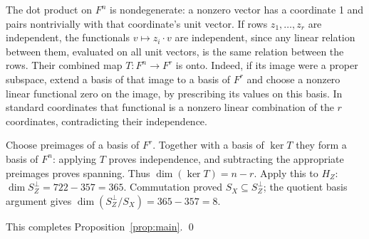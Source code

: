 \documentclass{article}
\begin{document}
The dot product on \(F^n\) is nondegenerate: a nonzero vector has a coordinate
1 and pairs nontrivially with that coordinate's unit vector. If rows
\(z_1, \dots, z_r\) are independent, the functionals \(v \mapsto z_i \cdot v\)
are independent, since any linear relation between them, evaluated on all unit
vectors, is the same relation between the rows. Their combined map
\(T \colon F^n \to F^r\) is onto. Indeed, if its image were a proper subspace,
extend a basis of that image to a basis of \(F^r\) and choose a nonzero linear
functional zero on the image, by prescribing its values on this basis. In
standard coordinates that functional is a nonzero linear combination of the
\(r\) coordinates, contradicting their independence.

Choose preimages of a basis of \(F^r\). Together with a basis of \(\ker T\)
they form a basis of \(F^n\): applying \(T\) proves independence, and
subtracting the appropriate preimages proves spanning. Thus
\(\dim(\ker T) = n - r\). Apply this to \(H_Z\):
\(\dim S_Z^{\perp} = 722 - 357 = 365\). Commutation proved
\(S_X \subseteq S_Z^{\perp}\); the quotient basis argument gives
\(\dim(S_Z^{\perp}/S_X) = 365 - 357 = 8\).

This completes Proposition~\ref{prop:main}. \qed
\end{document}
